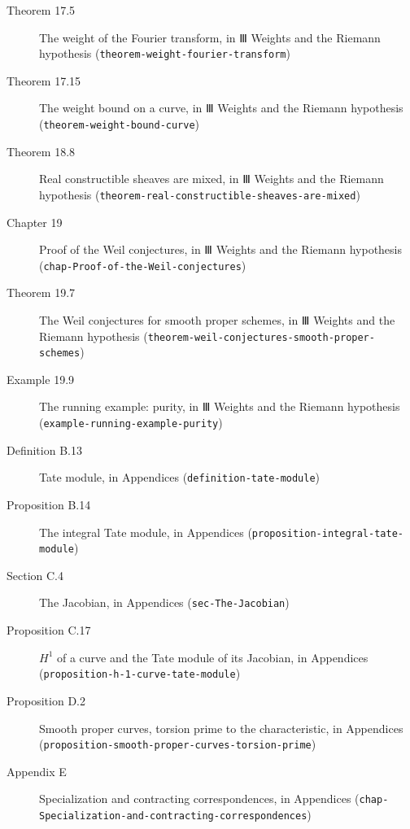 \documentclass[11pt]{article}
\newcommand{\bpslug}[1]{\texttt{#1}}
\begin{document}
\begin{description}
\item[Theorem 17.5] The weight of the Fourier transform, in Ⅲ Weights and the Riemann hypothesis (\bpslug{theorem-{}\allowbreak{}weight-{}\allowbreak{}fourier-{}\allowbreak{}transform})
\item[Theorem 17.15] The weight bound on a curve, in Ⅲ Weights and the Riemann hypothesis (\bpslug{theorem-{}\allowbreak{}weight-{}\allowbreak{}bound-{}\allowbreak{}curve})
\item[Theorem 18.8] Real constructible sheaves are mixed, in Ⅲ Weights and the Riemann hypothesis (\bpslug{theorem-{}\allowbreak{}real-{}\allowbreak{}constructible-{}\allowbreak{}sheaves-{}\allowbreak{}are-{}\allowbreak{}mixed})
\item[Chapter 19] Proof of the Weil conjectures, in Ⅲ Weights and the Riemann hypothesis (\bpslug{chap-{}\allowbreak{}Proof-{}\allowbreak{}of-{}\allowbreak{}the-{}\allowbreak{}Weil-{}\allowbreak{}conjectures})
\item[Theorem 19.7] The Weil conjectures for smooth proper schemes, in Ⅲ Weights and the Riemann hypothesis (\bpslug{theorem-{}\allowbreak{}weil-{}\allowbreak{}conjectures-{}\allowbreak{}smooth-{}\allowbreak{}proper-{}\allowbreak{}schemes})
\item[Example 19.9] The running example: purity, in Ⅲ Weights and the Riemann hypothesis (\bpslug{example-{}\allowbreak{}running-{}\allowbreak{}example-{}\allowbreak{}purity})
\item[Definition B.13] Tate module, in Appendices (\bpslug{definition-{}\allowbreak{}tate-{}\allowbreak{}module})
\item[Proposition B.14] The integral Tate module, in Appendices (\bpslug{proposition-{}\allowbreak{}integral-{}\allowbreak{}tate-{}\allowbreak{}module})
\item[Section C.4] The Jacobian, in Appendices (\bpslug{sec-{}\allowbreak{}The-{}\allowbreak{}Jacobian})
\item[Proposition C.17] $H^1$ of a curve and the Tate module of its Jacobian, in Appendices (\bpslug{proposition-{}\allowbreak{}h-{}\allowbreak{}1-{}\allowbreak{}curve-{}\allowbreak{}tate-{}\allowbreak{}module})
\item[Proposition D.2] Smooth proper curves, torsion prime to the characteristic, in Appendices (\bpslug{proposition-{}\allowbreak{}smooth-{}\allowbreak{}proper-{}\allowbreak{}curves-{}\allowbreak{}torsion-{}\allowbreak{}prime})
\item[Appendix E] Specialization and contracting correspondences, in Appendices (\bpslug{chap-{}\allowbreak{}Specialization-{}\allowbreak{}and-{}\allowbreak{}contracting-{}\allowbreak{}correspondences})
\end{description}
\clearpage{}%
\end{document}
